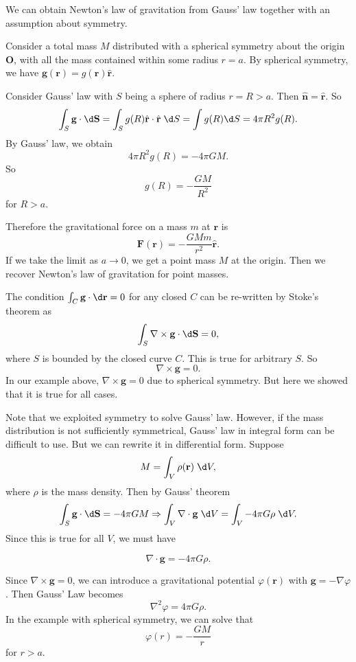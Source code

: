 \documentclass[a4paper]{article}
\begin{document}
\begin{eg}
  We can obtain Newton's law of gravitation from Gauss' law together with an assumption about symmetry.

  Consider a total mass $M$ distributed with a spherical symmetry about the origin $\mathbf{O}$, with all the mass contained within some radius $r = a$. By spherical symmetry, we have $\mathbf{g}(\mathbf{r}) = g(\mathbf{r})\hat{\mathbf{r}}$.

  Consider Gauss' law with $S$ being a sphere of radius $r = R > a$. Then $\hat{\mathbf{n}} = \hat{\mathbf{r}}$. So
  \[
    \int_S \mathbf{g}\cdot \d \mathbf{S} = \int_S g(R)\hat{\mathbf{r}}\cdot \hat{\mathbf{r}}\;\d S = \int g(R)\d S = 4\pi R^2 g(R).
  \]
  By Gauss' law, we obtain
  \[
    4\pi R^2 g(R) = -4\pi GM.
  \]
  So
  \[
    g(R) = -\frac{GM}{R^2}
  \]
  for $R > a$.

  Therefore the gravitational force on a mass $m$ at $\mathbf{r}$ is
  \[
    \mathbf{F}(\mathbf{r}) = -\frac{GMm}{r^2}\hat{\mathbf{r}}.
  \]
  If we take the limit as $a\to 0$, we get a point mass $M$ at the origin. Then we recover Newton's law of gravitation for point masses.
\end{eg}

The condition $\int_C \mathbf{g}\cdot \d \mathbf{r} = 0$ for any closed $C$ can be re-written by Stoke's theorem as
\[
  \int_S \nabla\times \mathbf{g}\cdot \d \mathbf{S} = 0,
\]
where $S$ is bounded by the closed curve $C$. This is true for arbitrary $S$. So
\[
  \nabla\times \mathbf{g} = 0.
\]
In our example above, $\nabla\times \mathbf{g} = 0$ due to spherical symmetry. But here we showed that it is true for all cases.

Note that we exploited symmetry to solve Gauss' law. However, if the mass distribution is not sufficiently symmetrical, Gauss' law in integral form can be difficult to use. But we can rewrite it in differential form. Suppose
\[
  M = \int_V \rho(\mathbf{r})\;\d V,
\]
where $\rho$ is the mass density. Then by Gauss' theorem
\[
  \int_S \mathbf{g} \cdot \d \mathbf{S} = -4\pi GM \Rightarrow \int_V \nabla\cdot \mathbf{g}\;\d V = \int_V -4\pi G\rho \;\d V.
\]
Since this is true for all $V$, we must have
\begin{law}
  \[
    \nabla\cdot \mathbf{g} = -4\pi G\rho.
  \]
\end{law}
Since $\nabla\times \mathbf{g} = 0$, we can introduce a gravitational potential $\varphi(\mathbf{r})$ with $\mathbf{g} = -\nabla \varphi$. Then Gauss' Law becomes
\[
  \nabla^2 \varphi = 4\pi G\rho.
\]
In the example with spherical symmetry, we can solve that
\[
  \varphi(r) = -\frac{GM}{r}
\]
for $r > a$.
\end{document}
